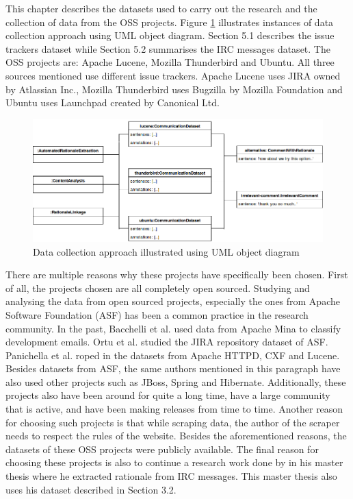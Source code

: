 \documentclass[a4paper,12pt,twoside]{report}
\begin{document}
This chapter describes the datasets used to carry out the research and the collection of data from the \acs{OSS} projects. Figure \ref{fig:dataObject} illustrates instances of data collection approach using UML object diagram. Section 5.1 describes the issue trackers dataset while Section 5.2 summarises the \acs{IRC} messages dataset. The \acs{OSS} projects are: Apache Lucene, Mozilla Thunderbird and Ubuntu. All three sources mentioned use different issue trackers. Apache Lucene uses JIRA owned by Atlassian Inc., Mozilla Thunderbird uses Bugzilla by Mozilla Foundation and Ubuntu uses Launchpad created by Canonical Ltd. 
\begin{figure}[h] %
    \centering
    \includegraphics[width=13cm]{data-collection-object-diagram}
    \caption{Data collection approach illustrated using UML object diagram}
    \label{fig:dataObject}
\end{figure}
\noindent \newline
There are multiple reasons why these projects have specifically been chosen. First of all, the projects chosen are all completely open sourced. Studying and analysing the data from open sourced projects, especially the ones from Apache Software Foundation (ASF) has been a common practice in the research community. In the past, Bacchelli et al.\cite{Bacchelli2012} used data from Apache Mina to classify development emails. Ortu et al.\cite{Ortu2015} studied the JIRA repository dataset of ASF. Panichella et al. \cite{Panichella2014} roped in the datasets from Apache HTTPD, CXF and Lucene. Besides datasets from ASF, the same authors mentioned in this paragraph have also used other projects such as JBoss, Spring and Hibernate. Additionally, these projects also have been around for quite a long time, have a large community that is active, and have been making releases from time to time. Another reason for choosing such projects is that while scraping data, the author of the scraper needs to respect the rules of the website. Besides the aforementioned reasons, the datasets of these \acs{OSS} projects were publicly available. The final reason for choosing these projects is also to continue a research work done by \cite{Nonnenmacher2017} in his master thesis where he extracted rationale from \acs{IRC} messages. This master thesis also uses his dataset described in Section 3.2. 
\end{document}
